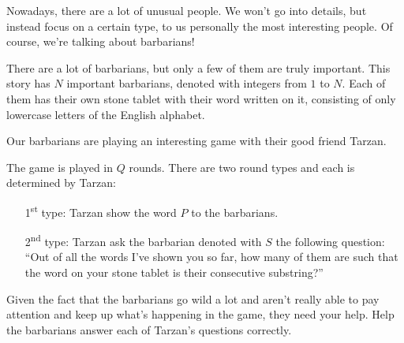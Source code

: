 \renewcommand{\taskname}{DIVLJAK}
\renewcommand{\timelimit}{4 seconds}
\renewcommand{\memorylimit}{768 MB}
\renewcommand{\score}{160 points}

Nowadays, there are a lot of unusual people. We won't go into details, but instead focus on a certain type, to us personally the most interesting people. Of course, we're talking about barbarians!

There are a lot of barbarians, but only a few of them are truly important. This story has $N$ important barbarians, denoted with integers from $1$ to $N$. Each of them has their own stone tablet with their word written on it, consisting of only lowercase letters of the English alphabet.

Our barbarians are playing an interesting game with their good friend Tarzan.

The game is played in $Q$ rounds. There are two round types and each is determined by Tarzan:
{
\begin{itemize}
\item[1\textsuperscript{st} type:] Tarzan show the word $P$ to the barbarians.
\item[2\textsuperscript{nd} type:] Tarzan ask the barbarian denoted with $S$ the following question: “Out of all the words I've shown you so far, how many of them are such that the word on your stone tablet is their consecutive substring?”
\end{itemize}}

Given the fact that the barbarians go wild a lot and aren't really able to pay attention and keep up what's happening in the game, they need your help. Help the barbarians answer each of Tarzan's questions correctly.

